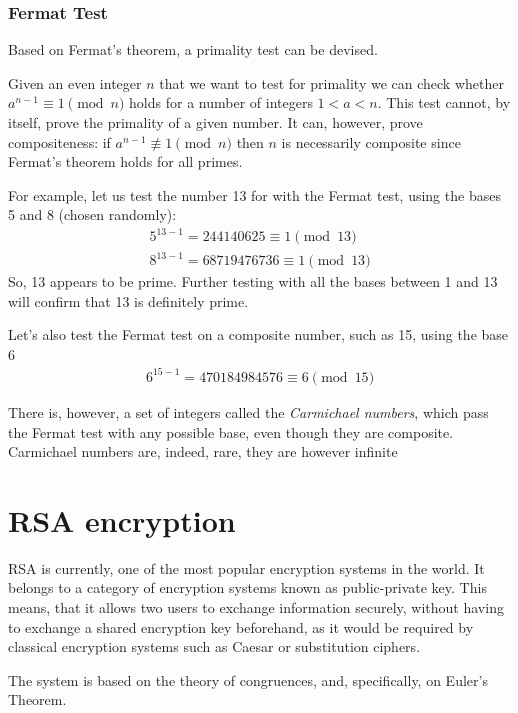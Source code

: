 \documentclass[12pt, titlepage]{article}
\begin{document}
    \subsubsection{Fermat Test}
        Based on Fermat's theorem, a primality test can be devised.

        Given an even integer $n$ that we want to test for primality we can check whether
        $a^{n-1} \equiv 1 \pmod{n}$ holds for a number of integers $1<a<n$.  This test cannot,
        by itself, prove the primality of a given number. It can, however, prove compositeness:
        if $a^{n-1} \not\equiv 1 \pmod{n}$ then $n$ is necessarily composite since Fermat's
        theorem holds for all primes.

        For example, let us test the number 13 for with the Fermat test, using the bases 5 and 8
        (chosen randomly):
        \begin{align*}
            5^{13-1} = 244140625   \equiv 1 \pmod{13}\\
            8^{13-1} = 68719476736 \equiv 1 \pmod{13}
        \end{align*}
        So, 13 appears to be prime. Further testing with all the bases between 1 and 13 will
        confirm that 13 is definitely prime.

        Let's also test the Fermat test on a composite number, such as 15, using the base 6
        \begin{align*}
            6^{15-1} = 470184984576 \equiv 6 \pmod{15}
        \end{align*}

        There is, however, a set of integers called the \emph{Carmichael numbers}, which pass
        the Fermat test with any possible base, even though they are composite. Carmichael
        numbers are, indeed, rare, they are however infinite



\section{RSA encryption}
RSA is currently, one of the most popular encryption systems in the world.  It belongs to a
category of encryption systems known as public-private key.  This means, that it allows two
users to exchange information securely, without having to exchange a shared encryption key
beforehand, as it would be required by classical encryption systems such as Caesar or
substitution ciphers. 

The system is based on the theory of congruences, and, specifically, on Euler's Theorem.
\end{document}
